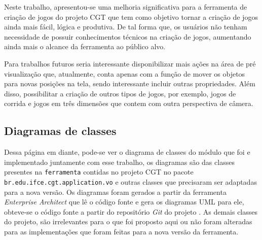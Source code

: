 \documentclass[12pt,twoside,openright,a4paper,english,brazil,sumario=tradicional]{abntex2}
\begin{document}
Neste trabalho, apresentou-se uma melhoria significativa para a ferramenta de criação de jogos do projeto CGT que tem como objetivo tornar a criação de jogos ainda mais fácil, lógica e produtiva. De tal forma que, os usuários não tenham necessidade de possuir conhecimentos técnicos na criação de jogos, aumentando ainda mais o alcance da ferramenta ao público alvo.

Para trabalhos futuros seria interessante disponibilizar mais ações na área de pré visualização que, atualmente, conta apenas com a função de mover os objetos para novas posições na tela, sendo interessante incluir outras propriedades. Além disso, possibilitar a criação de outros tipos de jogos, por exemplo, jogos de corrida e jogos em três dimensões que contem com outra perspectiva de câmera.

\postextual



\begin{anexosenv}
   \partanexos
   \chapter{Diagramas de classes}
   \label{chap:diagramas}
   Dessa página em diante, pode-se ver o diagrama de classes do módulo que foi e implementado juntamente com esse trabalho, os diagramas são das classes presentes na \texttt{ferramenta} contidas no projeto CGT no pacote \texttt{br.edu.ifce.cgt.application.vo} e outras classes que precisaram ser adaptadas para a nova versão. Os diagramas foram gerados a partir da ferramenta \textit{Enterprise Architect} que lê o código fonte e gera os diagramas UML para ele, obteve-se o código fonte a partir do repositório \textit{Git} do projeto \cite{website:projeto-cgt-repo}.
   As demais classes do projeto, são irrelevantes para o que foi proposto aqui ou não foram alteradas para as implementações que foram feitas para a nova versão da ferramenta.
   
\end{anexosenv}
\printindex
\end{document}
